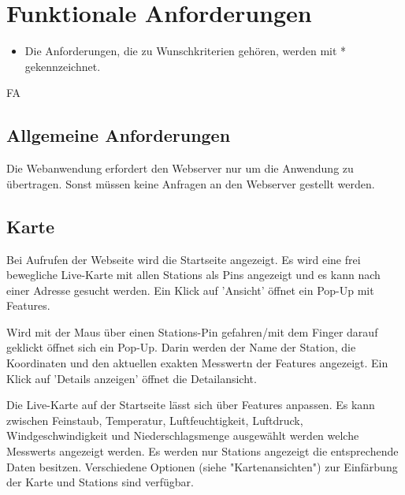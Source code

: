 \section{Funktionale Anforderungen}

\begin{itemize}
  \item Die Anforderungen, die zu Wunschkriterien gehören, werden mit * gekennzeichnet.
\end{itemize}

\setcounter{counter}{10}
\begin{Kriterien}{FA}

\subsection{Allgemeine Anforderungen}

 \item[Statische Webanwendung]
   Die \gls{Webanwendung} erfordert den \gls{Webserver} nur um die Anwendung zu übertragen.
   Sonst müssen keine Anfragen an den \gls{Webserver} gestellt werden. 

\subsection{Karte}

 \item[Startseite]
   Bei Aufrufen der Webseite wird die Startseite angezeigt.
   Es wird eine frei bewegliche \gls{Live-Karte} mit allen \glspl{Station} als \glspl{Pin} angezeigt und es kann nach einer Adresse gesucht werden.
   Ein Klick auf 'Ansicht' öffnet ein \gls{Pop-Up} mit \glspl{Feature}.

 \item[Stationen Pop-Up]
  Wird mit der Maus über einen Stations-\gls{Pin} gefahren/mit dem Finger darauf geklickt öffnet sich ein \gls{Pop-Up}.
  Darin werden der Name der \gls{Station}, die Koordinaten und den aktuellen exakten \gls{Messwert}n der \glspl{Feature} angezeigt.
  Ein Klick auf 'Details anzeigen' öffnet die \gls{Detailansicht}.

 \item[Features]
   Die \gls{Live-Karte} auf der Startseite lässt sich über \glspl{Feature} anpassen.
   Es kann zwischen Feinstaub, Temperatur, Luftfeuchtigkeit, Luftdruck, Windgeschwindigkeit und Niederschlagsmenge ausgewählt werden welche \glspl{Messwert} angezeigt werden.
   Es werden nur \glspl{Station} angezeigt die entsprechende Daten besitzen.
   Verschiedene Optionen (siehe "Kartenansichten") zur Einfärbung der Karte und \glspl{Station} sind verfügbar.


\end{Kriterien}
